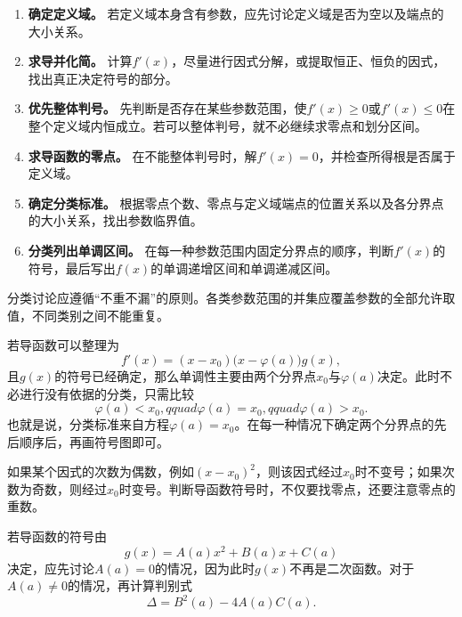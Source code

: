 \medskip
{}

\begin{enumerate}
  \item \textbf{确定定义域。} 若定义域本身含有参数，应先讨论定义域是否为空以及端点的大小关系。
  \item \textbf{求导并化简。} 计算$f'(x)$，尽量进行因式分解，或提取恒正、恒负的因式，找出真正决定符号的部分。
  \item \textbf{优先整体判号。} 先判断是否存在某些参数范围，使$f'(x)\geqslant0$或$f'(x)\leqslant0$在整个定义域内恒成立。若可以整体判号，就不必继续求零点和划分区间。
  \item \textbf{求导函数的零点。} 在不能整体判号时，解$f'(x)=0$，并检查所得根是否属于定义域。
  \item \textbf{确定分类标准。} 根据零点个数、零点与定义域端点的位置关系以及各分界点的大小关系，找出参数临界值。
  \item \textbf{分类列出单调区间。} 在每一种参数范围内固定分界点的顺序，判断$f'(x)$的符号，最后写出$f(x)$的单调递增区间和单调递减区间。
\end{enumerate}

\begin{remark}
分类讨论应遵循“不重不漏”的原则。各类参数范围的并集应覆盖参数的全部允许取值，不同类别之间不能重复。
\end{remark}

\medskip
{}

\medskip
{}

若导函数可以整理为
\[
f'(x)=(x-x_0)\bigl(x-\varphi(a)\bigr)g(x),
\]
且$g(x)$的符号已经确定，那么单调性主要由两个分界点$x_0$与$\varphi(a)$决定。此时不必进行没有依据的分类，只需比较
\[
\varphi(a)<x_0,qquad
\varphi(a)=x_0,qquad
\varphi(a)>x_0.
\]
也就是说，分类标准来自方程$\varphi(a)=x_0$。在每一种情况下确定两个分界点的先后顺序后，再画符号图即可。

如果某个因式的次数为偶数，例如$(x-x_0)^2$，则该因式经过$x_0$时不变号；如果次数为奇数，则经过$x_0$时变号。判断导函数符号时，不仅要找零点，还要注意零点的重数。

\medskip
{}

若导函数的符号由
\[
g(x)=A(a)x^2+B(a)x+C(a)
\]
决定，应先讨论$A(a)=0$的情况，因为此时$g(x)$不再是二次函数。对于$A(a)\neq0$的情况，再计算判别式
\[
\Delta=B^2(a)-4A(a)C(a).
\]

